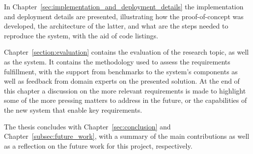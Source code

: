 In Chapter~\ref{sec:implementation_and_deployment_details} the implementation and deployment details are presented, illustrating how the proof-of-concept was developed, the architecture of the latter, and what are the steps needed to reproduce the system, with the aid of code listings.

Chapter~\ref{section:evaluation} contains the evaluation of the research topic, as well as the system. It contains the methodology used to assess the requirements fulfillment, with the support from benchmarks to the system's components as well as feedback from domain experts on the presented solution. At the end of this chapter a discussion on the more relevant requirements is made to highlight some of the more pressing matters to address in the future, or the capabilities of the new system that enable key requirements.

The thesis concludes with Chapter~\ref{sec:conclusion} and Chapter~\ref{subsec:future_work}, with a summary of the main contributions as well as a reflection on the future work for this project, respectively.